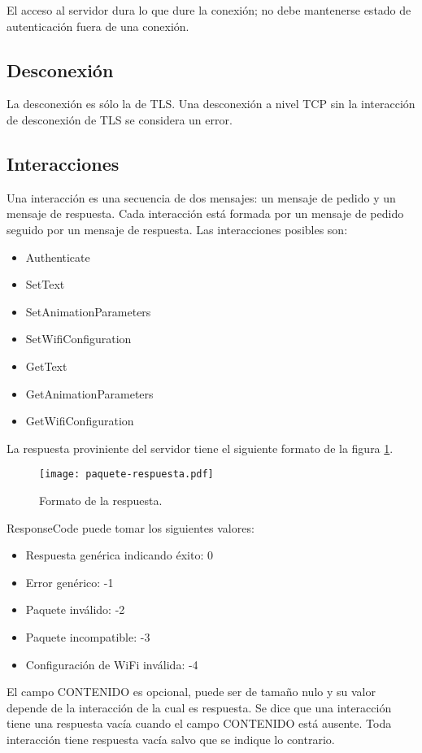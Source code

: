 El acceso al servidor dura lo que dure la conexión; no debe mantenerse estado de autenticación fuera de una conexión.

\subsection{Desconexión}
La desconexión es sólo la de TLS. Una desconexión a nivel TCP sin la interacción de desconexión de TLS se considera un error.

\subsection{Interacciones}
Una interacción es una secuencia de dos mensajes: un mensaje de pedido y un mensaje de respuesta. Cada interacción está formada por un mensaje de pedido seguido por un mensaje de respuesta.
Las interacciones posibles son:

\begin{itemize}
	\item Authenticate
	\item SetText
	\item SetAnimationParameters
	\item SetWifiConfiguration
	\item GetText
	\item GetAnimationParameters
	\item GetWifiConfiguration
\end{itemize}

La respuesta proviniente del servidor tiene el siguiente formato de la figura \ref{fig:paquete-respuesta}.

\begin{figure}[h]
	\centering
	\label{fig:paquete-respuesta}
	\texttt{[image: paquete-respuesta.pdf]}
		\caption{Formato de la respuesta.}
\end{figure}


ResponseCode puede tomar los siguientes valores:
\begin{itemize}
	\item Respuesta genérica indicando éxito: 0
	\item Error genérico: -1
	\item Paquete inválido: -2
	\item Paquete incompatible: -3
	\item Configuración de WiFi inválida: -4
\end{itemize}

El campo CONTENIDO es opcional, puede ser de tamaño nulo y su valor depende de la interacción de la cual es respuesta. Se dice que una interacción tiene una respuesta vacía cuando el campo CONTENIDO está ausente. Toda interacción tiene respuesta vacía salvo que se indique lo contrario.


